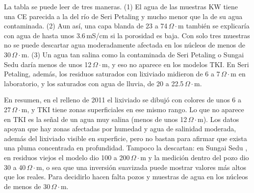 \documentclass[conference]{IEEEtran}
\newcommand{\ohmm}{\ensuremath{\Omega\!\cdot\!\mathrm{m}}}
\begin{document}
La tabla se puede leer de tres maneras. (1) El agua de las muestras KW tiene una CE parecida a la del río de Seri Petaling y mucho menor que la de su agua contaminada. (2) Aun así, una capa blanda de 23 a 74\,\ohmm{} también se explicaría con agua de hasta unos 3.6\,mS/cm si la porosidad es baja. Con solo tres muestras no se puede descartar agua moderadamente afectada en los núcleos de menos de 30\,\ohmm. (3) Un agua tan salina como la contaminada de Seri Petaling o Sungai Sedu daría menos de unos 12\,\ohmm, y eso no aparece en los modelos TKI. En Seri Petaling, además, los residuos saturados con lixiviado midieron de 6 a 7\,\ohmm{} en laboratorio, y los saturados con agua de lluvia, de 20 a 22.5\,\ohmm \cite{ahmed2001}.

En resumen, en el relleno de 2011 el lixiviado se dibujó con colores de unos 6 a 27\,\ohmm, y TKI tiene zonas superficiales en ese mismo rango. Lo que no aparece en TKI es la señal de un agua muy salina (menos de unos 12\,\ohmm). Los datos apoyan que hay zonas afectadas por humedad y agua de salinidad moderada, además del lixiviado visible en superficie, pero no bastan para afirmar que exista una pluma concentrada en profundidad. Tampoco la descartan: en Sungai Sedu \cite{hamzah2014}, en residuos viejos el modelo dio 100 a 200\,\ohmm{} y la medición dentro del pozo dio 30 a 40\,\ohmm, o sea que una inversión suavizada puede mostrar valores más altos que los reales. Para decidirlo hacen falta pozos y muestras de agua en los núcleos de menos de 30\,\ohmm.
\end{document}
